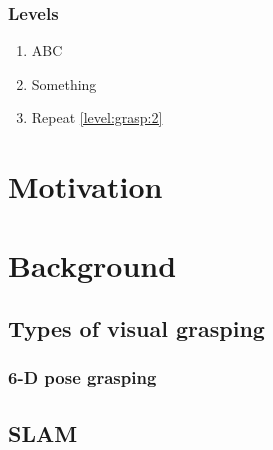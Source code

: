 \subsubsection{Levels}
\begin{enumerate}[label=\textbf{Level.\arabic*}]
    \item ABC \label{level:grasp:1}
    \item Something\label{level:grasp:2} 
    \item Repeat \label{level:grasp:3} \ref{level:grasp:2}
\end{enumerate}


\section{Motivation}
\noindent 


\section{Background}
\noindent {}

\subsection{Types of visual grasping}
\subsubsection{6-D pose grasping}
\subsection{\gls{SLAM}}
